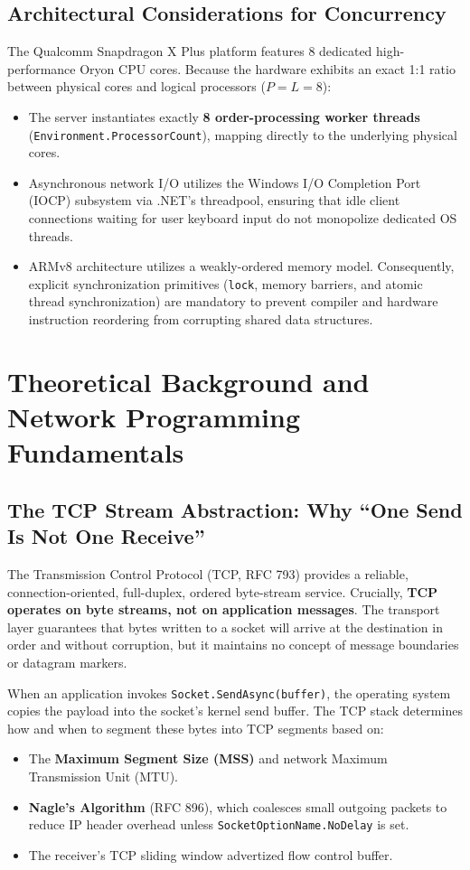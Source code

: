 \documentclass[12pt,a4paper]{article}
\begin{document}
\subsection{Architectural Considerations for Concurrency}
The Qualcomm Snapdragon X Plus platform features 8 dedicated high-performance Oryon CPU cores. Because the hardware exhibits an exact 1:1 ratio between physical cores and logical processors ($P = L = 8$):
\begin{itemize}
    \item The server instantiates exactly \textbf{8 order-processing worker threads} (\texttt{Environment.ProcessorCount}), mapping directly to the underlying physical cores.
    \item Asynchronous network I/O utilizes the Windows I/O Completion Port (IOCP) subsystem via .NET's threadpool, ensuring that idle client connections waiting for user keyboard input do not monopolize dedicated OS threads.
    \item ARMv8 architecture utilizes a weakly-ordered memory model. Consequently, explicit synchronization primitives (\texttt{lock}, memory barriers, and atomic thread synchronization) are mandatory to prevent compiler and hardware instruction reordering from corrupting shared data structures.
\end{itemize}

\section{Theoretical Background and Network Programming Fundamentals}

\subsection{The TCP Stream Abstraction: Why ``One Send Is Not One Receive''}
The Transmission Control Protocol (TCP, RFC 793) provides a reliable, connection-oriented, full-duplex, ordered byte-stream service. Crucially, \textbf{TCP operates on byte streams, not on application messages}. The transport layer guarantees that bytes written to a socket will arrive at the destination in order and without corruption, but it maintains no concept of message boundaries or datagram markers.

When an application invokes \texttt{Socket.SendAsync(buffer)}, the operating system copies the payload into the socket's kernel send buffer. The TCP stack determines how and when to segment these bytes into TCP segments based on:
\begin{itemize}
    \item The \textbf{Maximum Segment Size (MSS)} and network Maximum Transmission Unit (MTU).
    \item \textbf{Nagle's Algorithm} (RFC 896), which coalesces small outgoing packets to reduce IP header overhead unless \texttt{SocketOptionName.NoDelay} is set.
    \item The receiver's TCP sliding window advertized flow control buffer.
\end{itemize}
\end{document}
